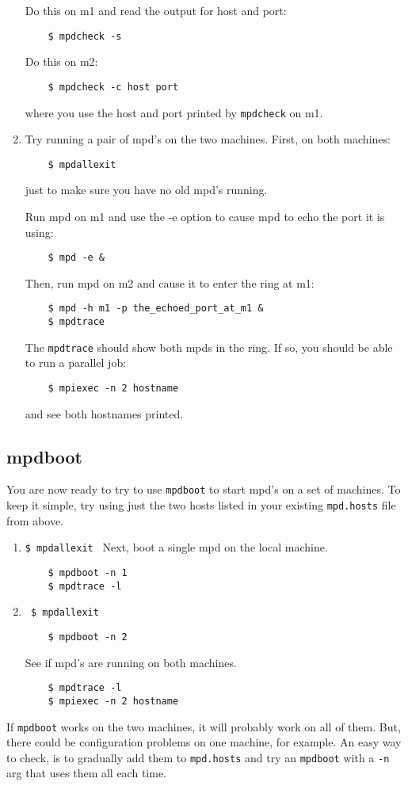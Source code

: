 \documentclass[dvipdfm,11pt]{article}
\begin{document}
\begin{enumerate}
Do this on m1 and read the output for host and port:
\begin{verbatim}
    $ mpdcheck -s
\end{verbatim}
Do this on m2:
\begin{verbatim}
    $ mpdcheck -c host port
\end{verbatim}
where you use the host and port printed by \texttt{mpdcheck} on m1.

\item Try running a pair of mpd's on the two machines.  First, on both
  machines:
\begin{verbatim}
    $ mpdallexit
\end{verbatim}
just to make sure you have no old mpd's running.

Run mpd on m1 and use the -e option to cause mpd to echo
the port it is using:
\begin{verbatim}
    $ mpd -e &        
\end{verbatim}
    Then, run mpd on m2 and cause it to enter the ring at m1:
\begin{verbatim}
    $ mpd -h m1 -p the_echoed_port_at_m1 &
    $ mpdtrace
\end{verbatim}
The \texttt{mpdtrace} should show both mpds in the ring.  If so,
you should be able to run a parallel job:
\begin{verbatim}
    $ mpiexec -n 2 hostname        
\end{verbatim}
and see both hostnames printed.
\end{enumerate}


\subsection{mpdboot}
\label{sec:mpdboot}

You are now ready to try to use \texttt{mpdboot} to start mpd's on a
set of machines.  To keep it simple, try using just the two
hosts listed in your existing \texttt{mpd.hosts} file from above.

\begin{enumerate}

\item  \verb+$ mpdallexit +
Next, boot a single mpd on the local machine.
\begin{verbatim}
    $ mpdboot -n 1
    $ mpdtrace -l
\end{verbatim}

\item \verb+ $ mpdallexit +
\begin{verbatim}
    $ mpdboot -n 2    
\end{verbatim}
See if mpd's are running on both machines.
\begin{verbatim}
    $ mpdtrace -l
    $ mpiexec -n 2 hostname
\end{verbatim}

\end{enumerate}

If \texttt{mpdboot} works on the two machines, it will probably work on
all of them.  But, there could be configuration problems on one machine,
for example.  An easy way to check, is to gradually add them to
\texttt{mpd.hosts} and try an \texttt{mpdboot} with a \texttt{-n} arg
that uses them all each time.
\end{document}
